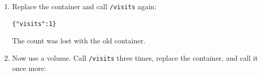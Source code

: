 \begin{enumerate}
\begin{codeblock}
  \end{codeblock}

  \begin{codeblock}
  \begin{Verbatim}[formatcom=\outputstyle]
  {"status":"ok","version":"dev"}
  {"visits":1}
  {"visits":2}
  appuser
  \end{Verbatim}
  \end{codeblock}

  \texttt{docker\ run} also prints the container's long ID; from here on such lines are left out. \texttt{curl} doesn't end with a new line, so your prompt may appear right after the JSON.
\item
  Replace the container and call \texttt{/visits} again:

  \begin{codeblock}

\begin{Shaded}
\begin{Highlighting}[]
 
\end{Highlighting}
\end{Shaded}

  \end{codeblock}

  \begin{codeblock}
  \begin{Verbatim}[formatcom=\outputstyle]
  {"visits":1}
  \end{Verbatim}
  \end{codeblock}

  The count was lost with the old container.
\item
  Now use a volume. Call \texttt{/visits} three times, replace the container, and call it once more:

  \begin{codeblock}


\end{codeblock}
\end{enumerate}
